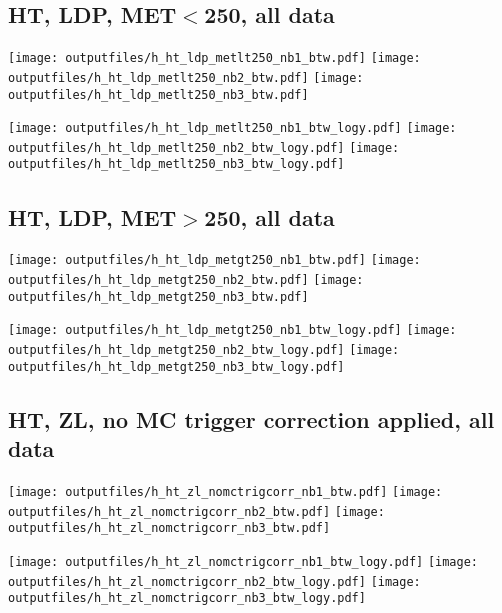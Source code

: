 \documentclass[11pt]{article}
\begin{document}
    \subsection{ HT, LDP, MET$<$250, all data}

    \noindent
     \texttt{[image: outputfiles/h\_ht\_ldp\_metlt250\_nb1\_btw.pdf]}
     \texttt{[image: outputfiles/h\_ht\_ldp\_metlt250\_nb2\_btw.pdf]}
     \texttt{[image: outputfiles/h\_ht\_ldp\_metlt250\_nb3\_btw.pdf]}

    \noindent
     \texttt{[image: outputfiles/h\_ht\_ldp\_metlt250\_nb1\_btw\_logy.pdf]}
     \texttt{[image: outputfiles/h\_ht\_ldp\_metlt250\_nb2\_btw\_logy.pdf]}
     \texttt{[image: outputfiles/h\_ht\_ldp\_metlt250\_nb3\_btw\_logy.pdf]}


    \subsection{ HT, LDP, MET$>$250, all data}

    \noindent
     \texttt{[image: outputfiles/h\_ht\_ldp\_metgt250\_nb1\_btw.pdf]}
     \texttt{[image: outputfiles/h\_ht\_ldp\_metgt250\_nb2\_btw.pdf]}
     \texttt{[image: outputfiles/h\_ht\_ldp\_metgt250\_nb3\_btw.pdf]}

    \noindent
     \texttt{[image: outputfiles/h\_ht\_ldp\_metgt250\_nb1\_btw\_logy.pdf]}
     \texttt{[image: outputfiles/h\_ht\_ldp\_metgt250\_nb2\_btw\_logy.pdf]}
     \texttt{[image: outputfiles/h\_ht\_ldp\_metgt250\_nb3\_btw\_logy.pdf]}


     \subsection{ HT, ZL, no MC trigger correction applied, all data}

    \noindent
     \texttt{[image: outputfiles/h\_ht\_zl\_nomctrigcorr\_nb1\_btw.pdf]}
     \texttt{[image: outputfiles/h\_ht\_zl\_nomctrigcorr\_nb2\_btw.pdf]}
     \texttt{[image: outputfiles/h\_ht\_zl\_nomctrigcorr\_nb3\_btw.pdf]}

    \noindent
     \texttt{[image: outputfiles/h\_ht\_zl\_nomctrigcorr\_nb1\_btw\_logy.pdf]}
     \texttt{[image: outputfiles/h\_ht\_zl\_nomctrigcorr\_nb2\_btw\_logy.pdf]}
     \texttt{[image: outputfiles/h\_ht\_zl\_nomctrigcorr\_nb3\_btw\_logy.pdf]}
\end{document}
